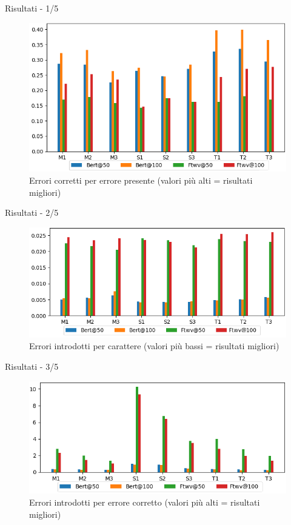 \documentclass{beamer}
\begin{document}
\begin{frame}{Risultati - 1/5}
\begin{figure}[H]
\includegraphics[width=.9\textwidth]{images/test/cp}
\caption{Errori corretti per errore presente (valori più alti = risultati migliori)}
\end{figure}
\end{frame}

\begin{frame}{Risultati - 2/5}
\begin{figure}[H]
\includegraphics[width=\textwidth]{images/test/if}
\caption{Errori introdotti per carattere (valori più bassi = risultati migliori)}
\end{figure}
\end{frame}

\begin{frame}{Risultati - 3/5}
\begin{figure}[H]
\includegraphics[width=\textwidth]{images/test/ic}
\caption{Errori introdotti per errore corretto (valori più alti = risultati migliori)}
\end{figure}
\end{frame}
\end{document}
